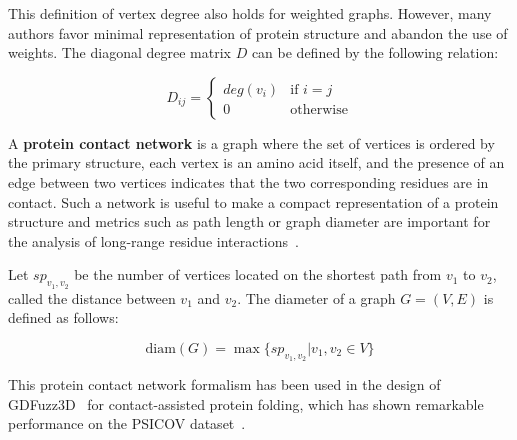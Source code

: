         This definition of vertex degree also holds for weighted graphs. However, many authors favor minimal representation of protein structure
        and abandon the use of weights. The diagonal degree matrix $D$ can be defined by the following relation:

        \begin{equation}
            D_{ij} =
                \begin{cases}
                    deg(v_i) & \text{if } i = j \\
                    0 & \text{otherwise}
                \end{cases}
        \end{equation}

        A \textbf{protein contact network} is a graph where the set of vertices is ordered by the primary structure, each vertex is an amino acid itself,
        and the presence of an edge between two vertices indicates that the two corresponding residues are in contact.
        Such a network is useful to make a compact
        representation of a protein structure and metrics such as path length or graph diameter are important for the analysis of long-range residue
        interactions~\cite{doi:10.1021/cr3002356}.

        Let $sp_{v_1,v_2}$ be the number of vertices located on the shortest path from $v_1$ to $v_2$, called the distance between $v_1$ and $v_2$.
        The diameter of a graph $G = (V, E)$ is defined as follows:

        \begin{equation}
            \text{diam}(G) = \max \{ sp_{v_1, v_2} | v_1, v_2 \in V \}
        \end{equation}

        This protein contact network formalism has been used in the design of GDFuzz3D~\cite{pietal2015gdfuzz3d}
        for contact-assisted protein folding, which has shown remarkable performance on the PSICOV
        dataset~\cite{doi:10.1093/bioinformatics/btr638}.
